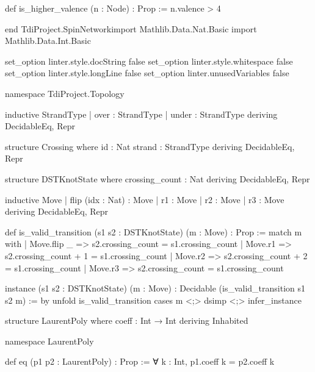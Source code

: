 \documentclass{article}
\newenvironment{Shaded}{%
  \begin{snugshade}%
}{%
  \end{snugshade}%
}%
\newenvironment{Highlighting}{%
}{%
}%
\newcommand{\NormalTok}[1]{#1}
\begin{document}
\begin{Shaded}
\begin{Highlighting}[]
\NormalTok{def is\_higher\_valence (n : Node) : Prop :=}
\NormalTok{  n.valence \textgreater{} 4}

\NormalTok{end TdiProject.SpinNetworkimport Mathlib.Data.Nat.Basic}
\NormalTok{import Mathlib.Data.Int.Basic}

\NormalTok{set\_option linter.style.docString false}
\NormalTok{set\_option linter.style.whitespace false}
\NormalTok{set\_option linter.style.longLine false}
\NormalTok{set\_option linter.unusedVariables false}

\NormalTok{namespace TdiProject.Topology}

\NormalTok{inductive StrandType}
\NormalTok{  | over  : StrandType}
\NormalTok{  | under : StrandType}
\NormalTok{  deriving DecidableEq, Repr}

\NormalTok{structure Crossing where}
\NormalTok{  id : Nat}
\NormalTok{  strand : StrandType}
\NormalTok{  deriving DecidableEq, Repr}

\NormalTok{structure DSTKnotState where}
\NormalTok{  crossing\_count : Nat}
\NormalTok{  deriving DecidableEq, Repr}

\NormalTok{inductive Move}
\NormalTok{  | flip (idx : Nat) : Move}
\NormalTok{  | r1               : Move}
\NormalTok{  | r2               : Move}
\NormalTok{  | r3               : Move}
\NormalTok{  deriving DecidableEq, Repr}

\NormalTok{def is\_valid\_transition (s1 s2 : DSTKnotState) (m : Move) : Prop :=}
\NormalTok{  match m with}
\NormalTok{  | Move.flip \_ =\textgreater{} s2.crossing\_count = s1.crossing\_count}
\NormalTok{  | Move.r1      =\textgreater{} s2.crossing\_count + 1 = s1.crossing\_count}
\NormalTok{  | Move.r2      =\textgreater{} s2.crossing\_count + 2 = s1.crossing\_count}
\NormalTok{  | Move.r3      =\textgreater{} s2.crossing\_count = s1.crossing\_count}

\NormalTok{instance (s1 s2 : DSTKnotState) (m : Move) : Decidable (is\_valid\_transition s1 s2 m) := by}
\NormalTok{  unfold is\_valid\_transition}
\NormalTok{  cases m \textless{};\textgreater{} dsimp \textless{};\textgreater{} infer\_instance}

\NormalTok{structure LaurentPoly where}
\NormalTok{  coeff : Int → Int}
\NormalTok{  deriving Inhabited}

\NormalTok{namespace LaurentPoly}

\NormalTok{def eq (p1 p2 : LaurentPoly) : Prop :=}
\NormalTok{  ∀ k : Int, p1.coeff k = p2.coeff k}


\end{Highlighting}
\end{Shaded}
\end{document}
